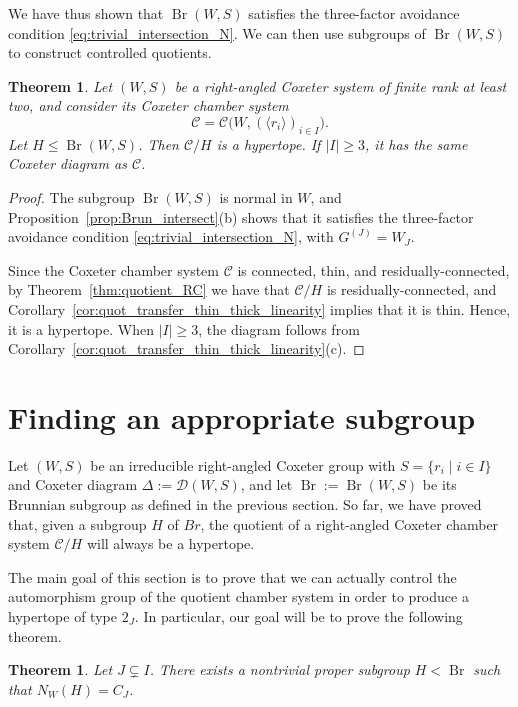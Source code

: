 \documentclass[10pt,a4paper]{amsart}
\newtheorem{thm}[prop]{Theorem}
\newcommand{\CC}{\mathcal{C}}
\newcommand{\D}{\mathcal{D}}
\newcommand{\C}{\mathcal{C}}
\newcommand{\Br}{\operatorname{Br}}
\begin{document}
We have thus shown that $\Br(W,S)$ satisfies the three-factor avoidance condition \eqref{eq:trivial_intersection_N}. We can then use subgroups of $\Br(W,S)$ to construct controlled quotients.
\begin{thm}
\label{thm:Brunnian-hypertope}
Let $(W,S)$ be a right-angled Coxeter system of finite rank at least two, and
consider its Coxeter chamber system
\[
    \CC=\CC\bigl(W,(\langle r_i\rangle)_{i\in I}\bigr).
\]
Let $H\leq\Br(W,S)$.  Then $\CC/H$ is a hypertope.  If $|I|\geq 3$, it has the same Coxeter diagram as $\CC$.
\end{thm}

\begin{proof}
The subgroup $\Br(W,S)$ is normal in $W$, and
Proposition~\ref{prop:Brun_intersect}(b) shows that it satisfies the
three-factor avoidance condition \eqref{eq:trivial_intersection_N}, with
$G^{(J)}=W_J$.

Since the Coxeter chamber system $\CC$ is connected, thin, and residually-connected, by 
Theorem~\ref{thm:quotient_RC} we have that $\CC/H$ is residually-connected,
and Corollary~\ref{cor:quot_transfer_thin_thick_linearity} implies that it is
thin. Hence, it is a hypertope. When $|I|\geq 3$, the diagram follows from  Corollary~\ref{cor:quot_transfer_thin_thick_linearity}(c). 
\end{proof}


\section{Finding an appropriate subgroup}
\label{sec:AppropriateSub}

Let $(W,S)$ be an irreducible right-angled Coxeter group with $ S= \{r_i\mid i\in I\}$ and Coxeter diagram $\Delta:= \D(W,S)$, and let $\Br:=\Br(W,S)$ be its Brunnian subgroup as defined in the previous section. So far, we have proved that, given a subgroup $H$ of $Br$, the quotient of a right-angled Coxeter chamber system $\C/H$ will always be a hypertope.

The main goal of this section is to prove that we can actually control the automorphism group of the quotient chamber system in order to produce a hypertope of type $2_J$. In particular, our goal will be to prove the following theorem.

\begin{thm}\label{thm:prescribed-normalizer}
Let $J\subsetneq I$.  There exists a nontrivial proper subgroup $H<\Br$ such that $N_W(H)=C_J$.
\end{thm}
\end{document}
